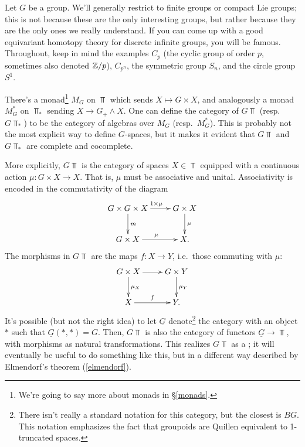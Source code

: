 \orbreak

Let $G$ be a group. We'll generally restrict to finite groups or compact Lie groups; this is not because these are
the only interesting groups, but rather because they are the only ones we really understand. If you can come up
with a good equivariant homotopy theory for discrete infinite groups, you will be famous. Throughout, keep in mind
the examples $C_p$ (the cyclic group of order $p$, sometimes also denoted $\mathbb Z/p$), $C_{p^n}$, the symmetric group
$S_n$, and the circle group $S^1$.

There's a monad\footnote{We're going to say more about monads in \S\ref{monads}.} $M_G$ on $\Top$ which sends
$X\mapsto G\times X$, and analogously a monad $M_G^*$ on $\Top_*$ sending $X\to G_+\land X$. One can define the
category of  $G\Top$ (resp.\  $G\Top_*$) to be the category of algebras
over $M_G$ (resp.\ $M_G^*$). This is probably not the most explicit way to define $G$-spaces, but it makes it
evident that $G\Top$ and $G\Top_*$ are complete and cocomplete.

More explicitly, $G\Top$ is the category of spaces $X\in\Top$ equipped with a continuous action $\mu\colon G\times
X\to X$. That is, $\mu$ must be associative and unital. Associativity is encoded in the commutativity of the
diagram
\[\xymatrix{
	G\times G\times X\ar[r]^{1\times\mu}\ar[d]^m & G\times X\ar[d]^\mu\\
	G\times X\ar[r]^\mu & X.
}\]
The morphisms in $G\Top$ are the  maps $f\colon X\to Y$, i.e.\ those commuting with $\mu$:
\[\xymatrix{
	G\times X\ar[r]\ar[d]^{\mu_X} & G\times Y\ar[d]^{\mu_Y}\\
	X\ar[r]^f & Y.
}\]
It's possible (but not the right idea) to let $\underline G$ denote\footnote{There isn't really a standard notation for this category, but the closest is $BG$. This notation emphasizes the fact that groupoids are Quillen equivalent to 1-truncated spaces.} the category with an object $*$ such that
$\underline G(*, *) = G$. Then, $G\Top$ is also the category of functors $\underline G\to\Top$, with morphisms as
natural transformations. This realizes $G\Top$ as a ; it will eventually be useful to do
something like this, but in a different way described by Elmendorf's theorem (\cref{elmendorf}).

